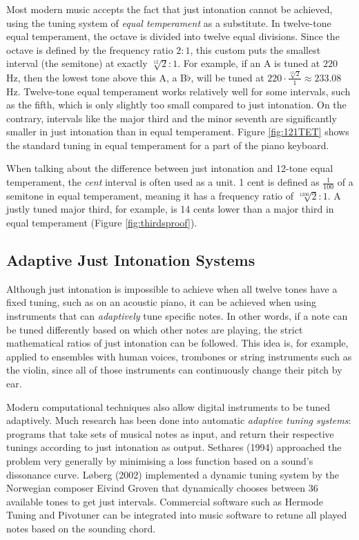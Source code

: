 \documentclass[a4paper]{article}
\begin{document}
Most modern music accepts the fact that just intonation cannot be achieved, using the tuning system of \textit{equal temperament} as a substitute. In twelve-tone equal temperament, the octave is divided into twelve equal divisions. Since the octave is defined by the frequency ratio $2:1$, this custom puts the smallest interval (the semitone) at exactly $\sqrt[12]{2}:1$. For example, if an A is tuned at $220$ Hz, then the lowest tone above this A, a B$\flat$, will be tuned at $220\cdot \frac{\sqrt[12]{2}}{1} \approx 233.08$ Hz.\cite{van_de_craats_fis_1989} Twelve-tone equal temperament works relatively well for some intervals, such as the fifth, which is only slightly too small compared to just intonation. On the contrary, intervals like the major third and the minor seventh are significantly smaller in just intonation than in equal temperament. Figure \ref{fig:121TET} shows the standard tuning in equal temperament for a part of the piano keyboard. 

When talking about the difference between just intonation and 12-tone equal temperament, the \textit{cent} interval is often used as a unit. 1 cent is defined as $\frac{1}{100}$ of a semitone in equal temperament, meaning it has a frequency ratio of $\sqrt[1200]{2}:1$. A justly tuned major third, for example, is 14 cents lower than a major third in equal temperament (Figure \ref{fig:thirdsproof}).

\subsection{Adaptive Just Intonation Systems}
\label{intro_adaptive_ji}
Although just intonation is impossible to achieve when all twelve tones have a fixed tuning, such as on an acoustic piano, it can be achieved when using instruments that can \textit{adaptively} tune specific notes. In other words, if a note can be tuned differently based on which other notes are playing, the strict mathematical ratios of just intonation can be followed. This idea is, for example, applied to ensembles with human voices, trombones or string instruments such as the violin, since all of those instruments can continuously change their pitch by ear.\cite{van_de_craats_fis_1989}

Modern computational techniques also allow digital instruments to be tuned adaptively. Much research has been done into automatic \textit{adaptive tuning systems}: programs that take sets of musical notes as input, and return their respective tunings according to just intonation as output. Sethares (1994) approached the problem very generally by minimising a loss function based on a sound's dissonance curve.\cite{sethares_adaptive_1994} Løberg (2002) implemented a dynamic tuning system by the Norwegian composer Eivind Groven that dynamically chooses between 36 available tones to get just intervals.\cite{code_grovenmax_2002} Commercial software such as Hermode Tuning\cite{mohrlok_hermode_2003} and Pivotuner\cite{noauthor_pivotuner_nodate} can be integrated into music software to retune all played notes based on the sounding chord.
\end{document}
